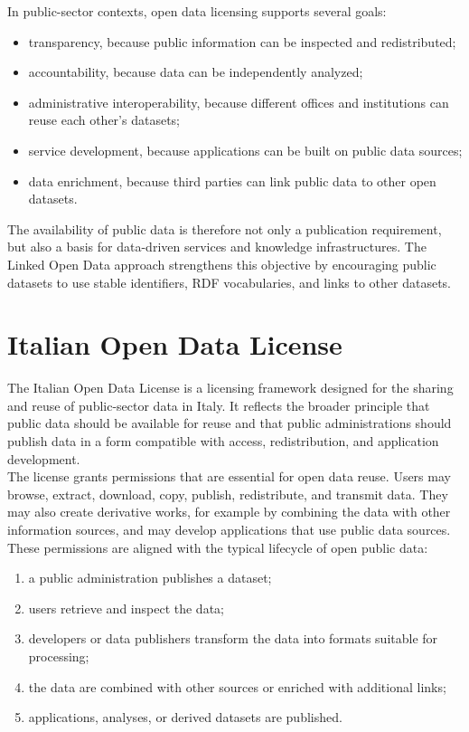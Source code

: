 \documentclass{scrbook}
\begin{document}
	In public-sector contexts, open data licensing supports several goals:
	
	\begin{itemize}
	    \item transparency, because public information can be inspected and redistributed;
	    \item accountability, because data can be independently analyzed;
	    \item administrative interoperability, because different offices and institutions can reuse each other's datasets;
	    \item service development, because applications can be built on public data sources;
	    \item data enrichment, because third parties can link public data to other open datasets.
	\end{itemize}
	
	The availability of public data is therefore not only a publication requirement, but also a basis for data-driven services and knowledge infrastructures. The Linked Open Data approach strengthens this objective by encouraging public datasets to use stable identifiers, RDF vocabularies, and links to other datasets.
	
	\section{Italian Open Data License}
	
	The Italian Open Data License is a licensing framework designed for the sharing and reuse of public-sector data in Italy. It reflects the broader principle that public data should be available for reuse and that public administrations should publish data in a form compatible with access, redistribution, and application development.\\
	
	The license grants permissions that are essential for open data reuse. Users may browse, extract, download, copy, publish, redistribute, and transmit data. They may also create derivative works, for example by combining the data with other information sources, and may develop applications that use public data sources.\\
	
	These permissions are aligned with the typical lifecycle of open public data:
	
	\begin{enumerate}
	    \item a public administration publishes a dataset;
	    \item users retrieve and inspect the data;
	    \item developers or data publishers transform the data into formats suitable for processing;
	    \item the data are combined with other sources or enriched with additional links;
	    \item applications, analyses, or derived datasets are published.
	\end{enumerate}
	
\end{document}
